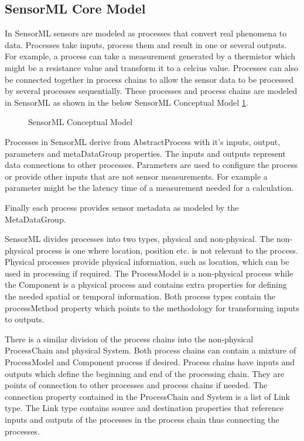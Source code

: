 \documentclass[]{final_report}
\begin{document}
\subsection{SensorML Core Model}
In SensorML sensors are modeled as processes that convert real phenomena to data. Processes take inputs, process them and result in one or several outputs. For example, a process can take a measurement generated by a thermistor which might be a resistance value and transform it to a celcius value. Processes can also be connected together in process chains to allow the sensor data to be processed by several processes sequentially. These processes and process chains are modeled in SensorML as shown in the  below SensorML Conceptual Model \ref{fig:SMLConceptualModel}.

\begin{figure}[h]
\centering
{}
\caption{SensorML Conceptual Model}\label{fig:SMLConceptualModel}
\end{figure}

Processes in SensorML derive from AbstractProcess with it's inputs, output, parameters and metaDataGroup properties. The inputs and outputs represent data connections to other processes. Parameters are used to configure the process or provide other inputs that are not sensor measurements. For example a parameter might be the latency time of a measurement needed for a calculation.

Finally each process provides sensor metadata as modeled by the MetaDataGroup.

SensorML divides processes into two types, physical and non-physical. The non-physical process is one where  location, position etc. is not relevant to the process. Physical processes provide physical information, such as location, which can be used in processing if required. The ProcessModel is a non-physical process while the Component is a physical process and contains extra properties for defining the needed spatial or temporal information. Both process types contain the processMethod property which points to the methodology for transforming inputs to outputs.

There is a similar division of the process chains into the non-physical ProcessChain and physical System. Both process chains can contain a mixture of ProcessModel and Component process if desired. Process chains have inputs and outputs which define the beginning and end of the processing chain. They are points of connection to other processes and process chains if needed. The connection property contained in the ProcessChain and System is a list of Link type. The Link type contains source and destination properties that reference inputs and outputs of the processes in the process chain thus connecting the processes. 
\end{document}
